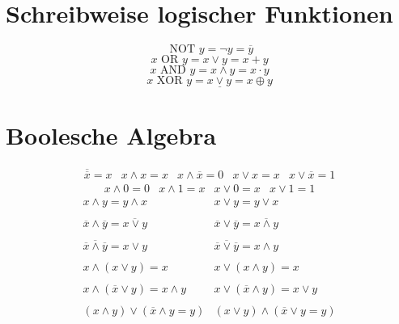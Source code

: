


\section{Schreibweise logischer Funktionen}
\[ \text{ NOT }y = \neg y = \overline{y} \]
\[ x\text{ OR }y = x \lor y = x + y \]
\[ x\text{ AND }y = x \land y = x \cdot y \]
\[ x\text{ XOR }y = x \underline{\lor} y = x \oplus y \]

\section{Boolesche Algebra}
\[ \begin{array}{lllll} \overline{\overline{x}} = x &
x \land x = x & 
x \land \overline{x} = 0 &
x \lor x = x &
x \lor \overline{x} = 1 \end{array} \]
\[ \begin{array}{llll} x \land 0 = 0 & 
x \land 1 = x & 
x \lor 0 = x & 
x \lor 1 = 1 \end{array}\]
\[ \begin{array}{ll}
x \land y = y \land x & 
x \lor y = y \lor x \\\\ 
\overline{x} \land \overline{y} = \overline{x \lor y} & 
\overline{x} \lor \overline{y} = \overline{x \land y} \\\\ 
\overline{\overline{x} \land \overline{y}} = x \lor y & 
\overline{\overline{x} \lor \overline{y}} = x \land y \\\\ 
x \land (x \lor y) = x & x \lor (x \land y) = x \\\\ 
x \land (\overline{x} \lor y) = x \land y & 
x \lor (\overline{x} \land y) = x \lor y \\\\ 
(x \land y) \lor (\overline{x} \land y = y) & 
(x \lor y) \land (\overline{x} \lor y = y) \\ 
\end{array} \]
\[  \]
